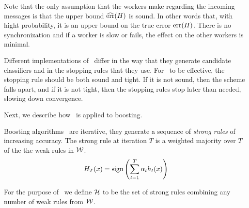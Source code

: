 Note that the only assumption that the workers make regarding the
incoming messages is that the upper bound $\widehat{\mbox{err}}(H)$ is sound. In
other words that, with hight probability, it is an upper bound on the
true error $\mbox{err}(H)$. There is no synchronization and if a worker is
slow or fails, the effect on the other workers is minimal.

Different implementations of \tmsn\ differ in the way that they
generate candidate classifiers and in the stopping rules that they
use. For \tmsn\ to be effective, the stopping rule should be both
sound and tight. If it is not sound, then the scheme falls apart, and
if it is not tight, then the stopping rules stop later than needed,
slowing down convergence.

Next, we describe how \tmsn\ is applied to boosting.






Boosting algorithms~\cite{schapire_boosting:_2012} are iterative, they generate a
sequence of {\em strong rules} of increasing accuracy. The strong rule
at iteration $T$ is a weighted majority over $T$ of the the weak rules
in $\mathcal{W}$.
$$H_T(x) = \mbox{sign} \left( \sum_{t=1}^T \alpha_t h_t(x) \right)$$

For the purpose of \tmsn\ we define ${\cal H}$ to be the set of
strong rules combining any number of weak rules from $\mathcal{W}$.

